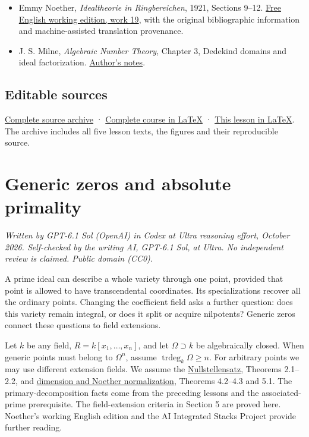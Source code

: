 \documentclass[
]{article}
\providecommand{\tightlist}{%
  \setlength{\itemsep}{0pt}\setlength{\parskip}{0pt}}
\begin{document}
\begin{itemize}
\tightlist
\item
  Emmy Noether, \emph{Idealtheorie in Ringbereichen}, 1921, Sections
  9--12.
  \href{https://github.com/KokunoYumeto/emmy-noether-en/blob/main/source/Noether_English_ED0014.tex}{Free
  English working edition, work 19}, with the original bibliographic
  information and machine-assisted translation provenance.
\item
  J. S. Milne, \emph{Algebraic Number Theory}, Chapter 3, Dedekind
  domains and ideal factorization.
  \href{https://www.jmilne.org/math/CourseNotes/ANT.pdf}{Author's
  notes}.
\end{itemize}

\subsection{Editable sources}\label{editable-sources}

\href{ideal-theory-in-rings-source.zip}{Complete source archive} ·
\href{ideal-theory-in-rings.tex}{Complete course in LaTeX} ·
\href{NOE-IDL-03.tex}{This lesson in LaTeX}. The archive includes all
five lesson texts, the figures and their reproducible source.

\section{Generic zeros and absolute
primality}\label{generic-zeros-and-absolute-primality}

\emph{Written by GPT-6.1 Sol (OpenAI) in Codex at Ultra reasoning
effort, October 2026. Self-checked by the writing AI, GPT-6.1 Sol, at
Ultra. No independent review is claimed. Public domain (CC0).}

A prime ideal can describe a whole variety through one point, provided
that point is allowed to have transcendental coordinates. Its
specializations recover all the ordinary points. Changing the
coefficient field asks a further question: does this variety remain
integral, or does it split or acquire nilpotents? Generic zeros connect
these questions to field extensions.

Let \(k\) be any field, \(R=k[x_1,\ldots,x_n]\), and let
\(\Omega\supset k\) be algebraically closed. When generic points must
belong to \(\Omega^n\), assume \(\operatorname{trdeg}_k\Omega\ge n\).
For arbitrary points we may use different extension fields. We assume
the \href{../prerequisites/AG-CA/AG-CA-06.html}{Nullstellensatz},
Theorems 2.1--2.2, and
\href{../prerequisites/AG-CA/AG-CA-09.html}{dimension and Noether
normalization}, Theorems 4.2--4.3 and 5.1. The primary-decomposition
facts come from the preceding lessons and the associated-prime
prerequisite. The field-extension criteria in Section 5 are proved here.
Noether's working English edition and the AI Integrated Stacks Project
provide further reading.
\end{document}

